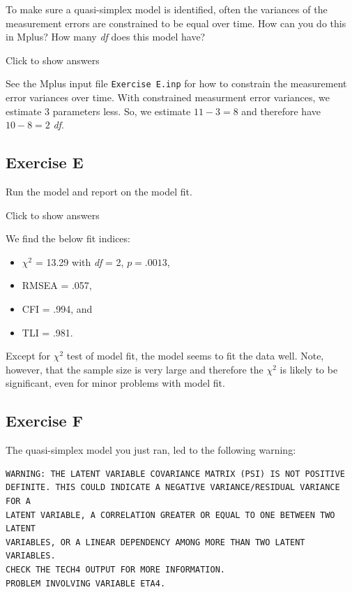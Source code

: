 \documentclass[
]{book}
\providecommand{\tightlist}{%
  \setlength{\itemsep}{0pt}\setlength{\parskip}{0pt}}
\begin{document}
To make sure a quasi-simplex model is identified, often the variances of the measurement errors are constrained to be equal over time. How can you do this in Mplus? How many \emph{df} does this model have?

Click to show answers

See the Mplus input file \texttt{Exercise\ E.inp} for how to constrain the measurement error variances over time. With constrained measurment error variances, we estimate 3 parameters less. So, we estimate \(11 - 3 = 8\) and therefore have \(10 - 8 = 2\) \emph{df}.

\hypertarget{exercise-e}{%
\subsection{Exercise E}\label{exercise-e}}

Run the model and report on the model fit.

Click to show answers

We find the below fit indices:

\begin{itemize}
\tightlist
\item
  \(\chi^{2}\) = 13.29 with \emph{df} = 2, \(p = .0013\),
\item
  RMSEA = .057,
\item
  CFI = .994, and
\item
  TLI = .981.
\end{itemize}

Except for \(\chi^{2}\) test of model fit, the model seems to fit the data well. Note, however, that the sample size is very large and therefore the \(\chi^{2}\) is likely to be significant, even for minor problems with model fit.

\hypertarget{exercise-f}{%
\subsection{Exercise F}\label{exercise-f}}

The quasi-simplex model you just ran, led to the following warning:

\begin{verbatim}
WARNING: THE LATENT VARIABLE COVARIANCE MATRIX (PSI) IS NOT POSITIVE
DEFINITE. THIS COULD INDICATE A NEGATIVE VARIANCE/RESIDUAL VARIANCE FOR A
LATENT VARIABLE, A CORRELATION GREATER OR EQUAL TO ONE BETWEEN TWO LATENT
VARIABLES, OR A LINEAR DEPENDENCY AMONG MORE THAN TWO LATENT VARIABLES.
CHECK THE TECH4 OUTPUT FOR MORE INFORMATION.
PROBLEM INVOLVING VARIABLE ETA4.
\end{verbatim}
\end{document}
